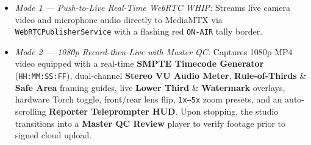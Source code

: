 {\begin{enumerate}[leftmargin=*,itemsep=2pt]
  \begin{itemize}[leftmargin=*,itemsep=1pt]
    \item \emph{Mode 1 --- Push-to-Live Real-Time WebRTC WHIP:} Streams live camera video and microphone audio directly to MediaMTX via \texttt{WebRTCPublisherService} with a flashing red \texttt{ON-AIR} tally border.
    \item \emph{Mode 2 --- 1080p Record-then-Live with Master QC:} Captures 1080p MP4 video equipped with a real-time \textbf{SMPTE Timecode Generator} (\texttt{HH:MM:SS:FF}), dual-channel \textbf{Stereo VU Audio Meter}, \textbf{Rule-of-Thirds} \& \textbf{Safe Area} framing guides, live \textbf{Lower Third} \& \textbf{Watermark} overlays, hardware Torch toggle, front/rear lens flip, \texttt{1x--5x} zoom presets, and an auto-scrolling \textbf{Reporter Teleprompter HUD}. Upon stopping, the studio transitions into a \textbf{Master QC Review} player to verify footage prior to signed cloud upload.
  \end{itemize}
\end{enumerate}
}

\begin{figure}[t]
\centering
\fitfull{\figScheduleConflict}
\caption{}\label{fig:mob_schedule_conflict}
\end{figure}

\begin{figure}[t]
\centering
\fitfull{\figAiPipeline}
\caption{}\label{fig:mob_ai_pipeline}
\end{figure}

\begin{figure}[t]
\centering
\fitfull{\figDatabaseArchitecture}
\caption{}\label{fig:mob_database_arch}
\end{figure}

\begin{figure}[t]
\centering
\fitfull{\figIngest}
\caption{}\label{fig:mob_ingest}
\end{figure}
